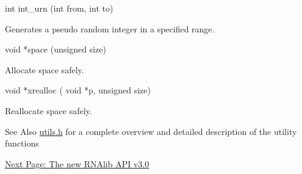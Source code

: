 \begin{DoxyVerb}int    int_urn (int from, int to)
\end{DoxyVerb}
 Generates a pseudo random integer in a specified range.

\begin{DoxyVerb}void  *space (unsigned size)
\end{DoxyVerb}
 Allocate space safely.

\begin{DoxyVerb}void  *xrealloc ( void *p,
                  unsigned size)
\end{DoxyVerb}
 Reallocate space safely.

\begin{DoxySeeAlso}{See Also}
\hyperlink{utils_8h}{utils.\-h} for a complete overview and detailed description of the utility functions
\end{DoxySeeAlso}


\hyperlink{mp_example}{Next Page\-: The new R\-N\-Alib A\-P\-I v3.0} 